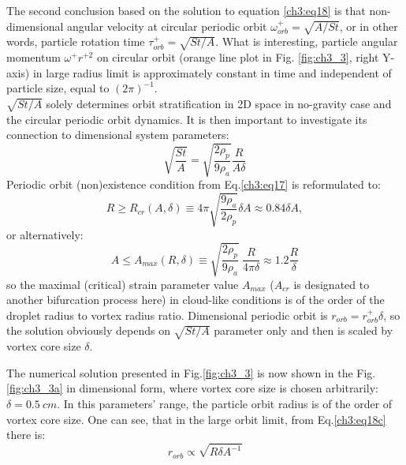 \documentclass[../main.tex]{subfiles}
\begin{document}
The second conclusion based on the solution to equation \ref{ch3:eq18} is that non-dimensional angular velocity at circular periodic orbit $\omega^{+}_{orb}=\sqrt{A/St}$, or in other words, particle rotation time $\tau^+_{orb}=\sqrt{St/A}$. What is interesting, particle angular momentum $\omega^{+} r^{+ 2}$ on circular orbit (orange line plot in Fig. \ref{fig:ch3_3}, right Y-axis) in large radius limit is approximately constant in time and independent of particle size, equal to $(2 \pi)^{-1}$. \\
$\sqrt{St/A}$ solely determines orbit stratification in 2D space in no-gravity case and the circular periodic orbit dynamics. It is then important to investigate its connection to dimensional system parameters:
\begin{equation}
\sqrt{\frac{St}{A}}=\sqrt{\frac{2\rho_p}{9 \rho_a}} \frac{R}{A \delta} 
\label{ch3:eq19_0}
\end{equation}
Periodic orbit (non)existence condition from Eq.\ref{ch3:eq17} is reformulated to:
\begin{equation}
R \geq R_{cr}(A,\delta) \equiv 4 \pi \sqrt{\frac{9\rho_a}{2\rho_p}}\delta A \approx 0.84 \delta A,
\label{ch3:eq19}
\end{equation}
or alternatively:
\begin{equation}
A \leq A_{max}(R,\delta)\equiv \sqrt{\frac{2\rho_p}{9\rho_a}}\  \frac{R}{4 \pi \delta}\approx 1.2 \frac{R}{\delta}
\label{ch3:eq19a}
\end{equation}
so the maximal (critical) strain parameter value $A_{max}$ ($A_{cr}$ is designated to another bifurcation process here) in cloud-like conditions is of the order of the droplet radius to vortex radius ratio.
Dimensional periodic orbit is $r_{orb}=r^+_{orb} \delta$, so the solution obviously depends on $\sqrt{St/A}$ parameter only and then is scaled by vortex core size $\delta$.

 The numerical solution presented in Fig.\ref{fig:ch3_3} is now shown in the Fig. \ref{fig:ch3_3a} in dimensional form, where vortex core size is chosen arbitrarily: $\delta=0.5~cm$. In this parameters' range, the particle orbit radius is of the order of vortex core size. One can see, that in the large orbit limit, from Eq.\ref {ch3:eq18c} there is:
\begin{equation}
r_{orb}\propto \sqrt{R \delta A^{-1}}
\label{ch3:eq19b}
\end{equation}
\end{document}
